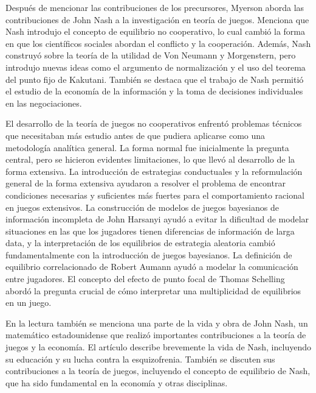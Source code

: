 \documentclass[11pt]{article}
\begin{document}
\begin{flushleft}
    Después de mencionar las contribuciones de los precursores, Myerson aborda las contribuciones de John Nash a la investigación en teoría de juegos. Menciona que Nash introdujo el concepto de equilibrio no cooperativo, lo cual cambió la forma en que los científicos sociales abordan el conflicto y la cooperación. Además, Nash construyó sobre la teoría de la utilidad de Von Neumann y Morgenstern, pero introdujo nuevas ideas como el argumento de normalización y el uso del teorema del punto fijo de Kakutani. También se destaca que el trabajo de Nash permitió el estudio de la economía de la información y la toma de decisiones individuales en las negociaciones.

    El desarrollo de la teoría de juegos no cooperativos enfrentó problemas técnicos que necesitaban más estudio antes de que pudiera aplicarse como una metodología analítica general. La forma normal fue inicialmente la pregunta central, pero se hicieron evidentes limitaciones, lo que llevó al desarrollo de la forma extensiva. La introducción de estrategias conductuales y la reformulación general de la forma extensiva ayudaron a resolver el problema de encontrar condiciones necesarias y suficientes más fuertes para el comportamiento racional en juegos extensivos. La construcción de modelos de juegos bayesianos de información incompleta de John Harsanyi ayudó a evitar la dificultad de modelar situaciones en las que los jugadores tienen diferencias de información de larga data, y la interpretación de los equilibrios de estrategia aleatoria cambió fundamentalmente con la introducción de juegos bayesianos. La definición de equilibrio correlacionado de Robert Aumann ayudó a modelar la comunicación entre jugadores. El concepto del efecto de punto focal de Thomas Schelling abordó la pregunta crucial de cómo interpretar una multiplicidad de equilibrios en un juego.

    En la lectura también se menciona una parte de la vida y obra de John Nash, un matemático estadounidense que realizó importantes contribuciones a la teoría de juegos y la economía. El artículo describe brevemente la vida de Nash, incluyendo su educación y su lucha contra la esquizofrenia. También se discuten sus contribuciones a la teoría de juegos, incluyendo el concepto de equilibrio de Nash, que ha sido fundamental en la economía y otras disciplinas.


\end{flushleft}
\end{document}
